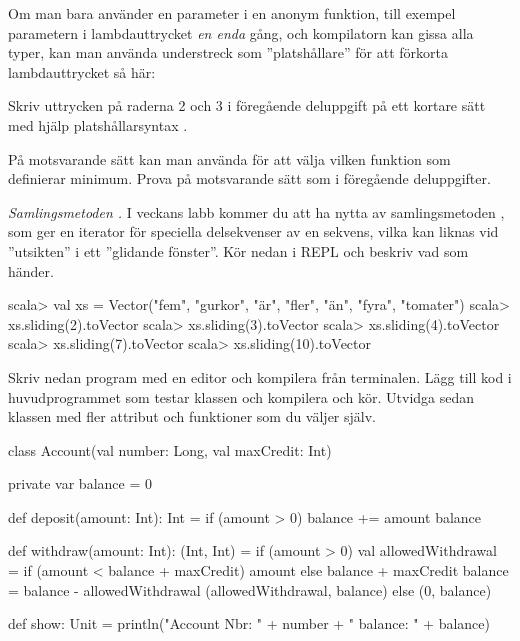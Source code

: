 {{\Subtask Om man bara använder en parameter i en anonym funktion, till exempel parametern  i lambdauttrycket  \emph{en enda} gång, och kompilatorn kan gissa alla typer, kan man använda understreck som ''platshållare'' för att förkorta lambdauttrycket så här:  

Skriv uttrycken på raderna 2 och 3 i föregående deluppgift på ett kortare sätt med hjälp platshållarsyntax .  

\Subtask På motsvarande sätt kan man använda  för att välja vilken funktion som definierar minimum. Prova  på motsvarande sätt som i föregående deluppgifter.

\Task \emph{Samlingsmetoden .} I veckans labb kommer du att ha nytta av samlingsmetoden , som ger en iterator för speciella delsekvenser av en sekvens, vilka kan liknas vid ''utsikten'' i ett ''glidande fönster''. Kör nedan i REPL och beskriv vad som händer.

\begin{REPL}
scala> val xs = Vector("fem", "gurkor", "är", "fler", "än", "fyra", "tomater")
scala> xs.sliding(2).toVector
scala> xs.sliding(3).toVector
scala> xs.sliding(4).toVector
scala> xs.sliding(7).toVector
scala> xs.sliding(10).toVector
\end{REPL}

\clearpage

\ExtraTasks %


\Task Skriv nedan program med en editor och kompilera från terminalen. Lägg till kod i huvudprogrammet som testar klassen  och kompilera och kör. Utvidga sedan klassen  med fler attribut och funktioner som du väljer själv.

\begin{Code}
class Account(val number: Long, val maxCredit: Int){ 
  private var balance = 0
  
  def deposit(amount: Int): Int = { 
    if (amount > 0) {balance += amount}
    balance
  }
  
  def withdraw(amount: Int): (Int, Int) = if (amount > 0) { 
    val allowedWithdrawal = 
      if (amount < balance + maxCredit) amount 
      else balance + maxCredit 
    balance = balance - allowedWithdrawal
    (allowedWithdrawal, balance)
  } else (0, balance)
  
  def show: Unit = 
    println("Account Nbr: " + number + " balance: " + balance) 
}


\end{Code}}}
